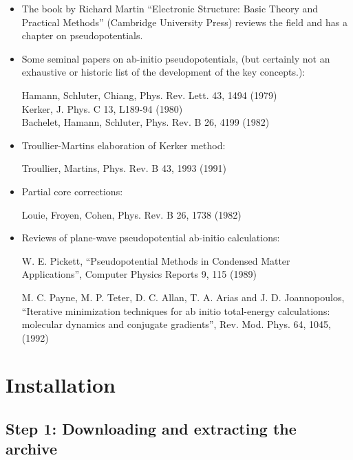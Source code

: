 \documentclass[11pt]{article}
\begin{document}
\begin{itemize}

\item

The book by Richard Martin
``Electronic Structure: Basic Theory and Practical Methods''
(Cambridge University Press) reviews the field
and has a chapter on pseudopotentials.

\item Some seminal papers on ab-initio pseudopotentials, (but certainly
not an exhaustive or historic list of the development of the key concepts.):

Hamann, Schluter, Chiang, Phys. Rev. Lett. 43, 1494 (1979)\\
Kerker, J. Phys. C 13, L189-94 (1980)\\
Bachelet, Hamann, Schluter, Phys. Rev. B 26, 4199 (1982)

\item Troullier-Martins elaboration of Kerker method:

Troullier, Martins, Phys. Rev. B 43, 1993 (1991)\\

\item Partial core corrections:

Louie, Froyen, Cohen, Phys. Rev. B 26, 1738 (1982)

\item Reviews of plane-wave pseudopotential ab-initio calculations:

W. E. Pickett, ``Pseudopotential Methods in Condensed Matter
Applications'', Computer Physics Reports 9, 115 (1989)

M. C. Payne, M. P. Teter, D. C. Allan, T. A. Arias and
J. D. Joannopoulos, ``Iterative minimization techniques for ab initio
total-energy calculations: molecular dynamics and conjugate
gradients'', Rev. Mod. Phys. 64, 1045, (1992)

\end{itemize}




\section{Installation}
\label{sec:install}

\subsection{Step 1: Downloading and extracting the archive}
\label{sec:step1}
\end{document}
